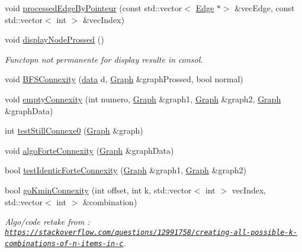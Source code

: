 \begin{DoxyCompactItemize}
\item 
void \mbox{\hyperlink{struct_algorithm_ad92c4d7081bf7851114a5f9b76b106bf}{processed\+Edge\+By\+Pointeur}} (const std\+::vector$<$ \mbox{\hyperlink{class_edge}{Edge}} $\ast$$>$ \&vec\+Edge, const std\+::vector$<$ int $>$ \&vec\+Index)
\item 
void \mbox{\hyperlink{struct_algorithm_a471cce04cc5a3fb74800171c0de76f3d}{display\+Node\+Prossed}} ()
\begin{DoxyCompactList}\small\item\em Functopn not permanente for display resulte in consol. \end{DoxyCompactList}\item 
void \mbox{\hyperlink{struct_algorithm_ab6992a48b0de3c2a9cdc638761e9e531}{B\+F\+S\+Connexity}} (\mbox{\hyperlink{_graph_8h_a98cbe1f79429fc62806b32b6e8871d9e}{data}} d, \mbox{\hyperlink{class_graph}{Graph}} \&graph\+Prossed, bool normal)
\item 
void \mbox{\hyperlink{struct_algorithm_a363b2a9d18b83cf776182996ed9b1b91}{empty\+Connexity}} (int numero, \mbox{\hyperlink{class_graph}{Graph}} \&graph1, \mbox{\hyperlink{class_graph}{Graph}} \&graph2, \mbox{\hyperlink{class_graph}{Graph}} \&graph\+Data)
\item 
int \mbox{\hyperlink{struct_algorithm_afe508cd75cffaed44b891e17932b1ef8}{test\+Still\+Connexe0}} (\mbox{\hyperlink{class_graph}{Graph}} \&graph)
\item 
void \mbox{\hyperlink{struct_algorithm_a7c4b5577dd51f39ebff598c5d01fd9d6}{algo\+Forte\+Connexity}} (\mbox{\hyperlink{class_graph}{Graph}} \&graph\+Data)
\item 
bool \mbox{\hyperlink{struct_algorithm_a0d7dc9d28bd602b2dbfa23bab74396c9}{test\+Identic\+Forte\+Connexity}} (\mbox{\hyperlink{class_graph}{Graph}} \&graph1, \mbox{\hyperlink{class_graph}{Graph}} \&graph2)
\item 
bool \mbox{\hyperlink{struct_algorithm_a58bead487e29355d8d69ea68f598d6f1}{go\+Kmin\+Connexity}} (int offset, int k, std\+::vector$<$ int $>$ vec\+Index, std\+::vector$<$ int $>$ \&combination)
\begin{DoxyCompactList}\small\item\em Algo/code retake from \+: \href{https://stackoverflow.com/questions/12991758/creating-all-possible-k-combinations-of-n-items-in-c}{\tt https\+://stackoverflow.\+com/questions/12991758/creating-\/all-\/possible-\/k-\/combinations-\/of-\/n-\/items-\/in-\/c}. \end{DoxyCompactList}\item 
$$
\end{DoxyCompactItemize}
